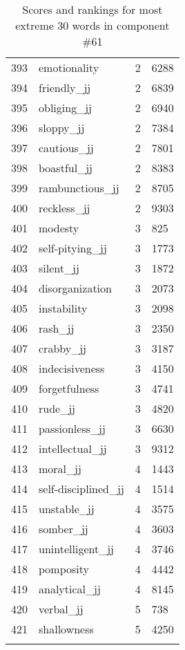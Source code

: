 \begin{longtable}[!htbp]{| rlr@{.}l |}
    393 & emotionality & 2 & 6288 \\
    394 & friendly\_jj & 2 & 6839 \\
    395 & obliging\_jj & 2 & 6940 \\
    396 & sloppy\_jj & 2 & 7384 \\
    397 & cautious\_jj & 2 & 7801 \\
    398 & boastful\_jj & 2 & 8383 \\
    399 & rambunctious\_jj & 2 & 8705 \\
    400 & reckless\_jj & 2 & 9303 \\
    401 & modesty & 3 & 825 \\
    402 & self-pitying\_jj & 3 & 1773 \\
    403 & silent\_jj & 3 & 1872 \\
    404 & disorganization & 3 & 2073 \\
    405 & instability & 3 & 2098 \\
    406 & rash\_jj & 3 & 2350 \\
    407 & crabby\_jj & 3 & 3187 \\
    408 & indecisiveness & 3 & 4150 \\
    409 & forgetfulness & 3 & 4741 \\
    410 & rude\_jj & 3 & 4820 \\
    411 & passionless\_jj & 3 & 6630 \\
    412 & intellectual\_jj & 3 & 9312 \\
    413 & moral\_jj & 4 & 1443 \\
    414 & self-disciplined\_jj & 4 & 1514 \\
    415 & unstable\_jj & 4 & 3575 \\
    416 & somber\_jj & 4 & 3603 \\
    417 & unintelligent\_jj & 4 & 3746 \\
    418 & pomposity & 4 & 4442 \\
    419 & analytical\_jj & 4 & 8145 \\
    420 & verbal\_jj & 5 & 738 \\
    421 & shallowness & 5 & 4250 \\
    \hline
    \caption{Scores and rankings for most extreme 30 words in component \#61} \\
\end{longtable}
